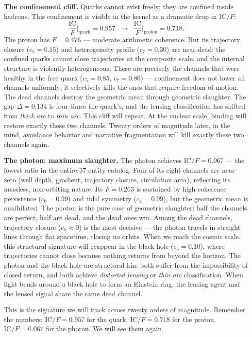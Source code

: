 \documentclass[
  aps,
  prd,
  twocolumn,
  superscriptaddress,
  nofootinbib,
  floatfix
]{revtex4-2}
\newcommand{\beq}{\begin{equation}}
\newcommand{\eeq}{\end{equation}}
\newcommand{\IC}{\mathrm{IC}}
\begin{document}
\textbf{The confinement cliff.}
Quarks cannot exist freely; they are confined inside hadrons.
This confinement is visible in the kernel as a dramatic drop
in $\IC/F$:
\beq\label{eq:confinement}
  \frac{\IC}{F}\bigg|_{\text{quark}} = 0.957
  \;\;\longrightarrow\;\;
  \frac{\IC}{F}\bigg|_{\text{proton}} = 0.718.
\eeq
The proton has $F = 0.476$ --- moderate arithmetic coherence.
But its trajectory closure ($c_5 = 0.15$) and heterogeneity
profile ($c_7 = 0.30$) are near-dead: the confined quarks
cannot close trajectories at the composite scale, and the
internal structure is violently heterogeneous.  These are
precisely the channels that were healthy in the free quark
($c_5 = 0.85$, $c_7 = 0.80$) --- confinement does not lower
all channels uniformly; it selectively kills the ones that
require freedom of motion.  The dead channels destroy the
geometric mean through geometric slaughter.  The gap
$\Delta = 0.134$ is four times the quark's, and the
lensing classification has shifted from \emph{thick arc}
to \emph{thin arc}.
This cliff will repeat.  At the nuclear scale, binding will
restore exactly these two channels.  Twenty orders of
magnitude later, in the mind, avoidance behavior and
narrative fragmentation will kill exactly these two channels
again.

\textbf{The photon: maximum slaughter.}
The photon achieves $\IC/F = 0.067$ --- the lowest ratio in
the entire 37-entity catalog.  Four of its eight channels are
near-zero (well depth, gradient, trajectory closure,
circulation area), reflecting its massless, non-orbiting
nature.  Its $F = 0.263$ is sustained by high coherence
persistence ($c_0 = 0.99$) and tidal symmetry ($c_4 = 0.99$),
but the geometric mean is annihilated.  The photon is the
pure case of geometric slaughter: half the channels are
perfect, half are dead, and the dead ones win.
Among the dead channels, trajectory closure ($c_5 \approx 0$)
is the most decisive --- the photon travels in straight lines
through flat spacetime, closing no orbits.  When we reach the
cosmic scale, this structural signature will reappear in the
black hole ($c_5 = 0.10$), where trajectories cannot close
because nothing returns from beyond the horizon.  The photon
and the black hole are structural kin: both suffer from the
impossibility of closed return, and both achieve \emph{distorted
lensing} or \emph{thin arc} classification.  When light bends
around a black hole to form an Einstein ring, the lensing agent
and the lensed signal share the same dead channel.

This is the signature we will track across twenty orders of
magnitude.  Remember the numbers: $\IC/F = 0.957$ for the
quark, $\IC/F = 0.718$ for the proton, $\IC/F = 0.067$ for
the photon.  We will see them again.
\end{document}
